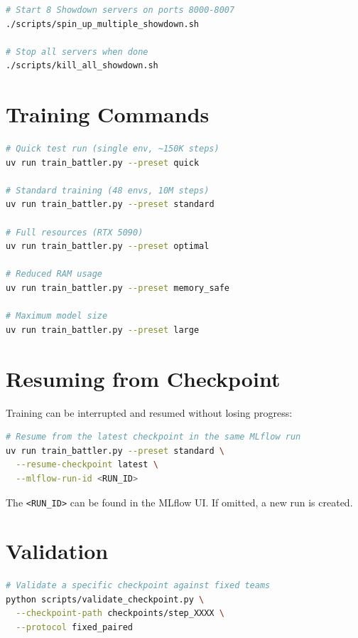 \begin{lstlisting}[language=bash]
# Start 8 Showdown servers on ports 8000-8007
./scripts/spin_up_multiple_showdown.sh

# Stop all servers when done
./scripts/kill_all_showdown.sh
\end{lstlisting}

\section{Training Commands}

\begin{lstlisting}[language=bash]
# Quick test run (single env, ~150K steps)
uv run train_battler.py --preset quick

# Standard training (48 envs, 10M steps)
uv run train_battler.py --preset standard

# Full resources (RTX 5090)
uv run train_battler.py --preset optimal

# Reduced RAM usage
uv run train_battler.py --preset memory_safe

# Maximum model size
uv run train_battler.py --preset large
\end{lstlisting}

\section{Resuming from Checkpoint}

Training can be interrupted and resumed without losing progress:

\begin{lstlisting}[language=bash]
# Resume from the latest checkpoint in the same MLflow run
uv run train_battler.py --preset standard \
  --resume-checkpoint latest \
  --mlflow-run-id <RUN_ID>
\end{lstlisting}

The \texttt{<RUN\_ID>} can be found in the MLflow UI.  If omitted, a new run
is created.

\section{Validation}

\begin{lstlisting}[language=bash]
# Validate a specific checkpoint against fixed teams
python scripts/validate_checkpoint.py \
  --checkpoint-path checkpoints/step_XXXX \
  --protocol fixed_paired

\end{lstlisting}

